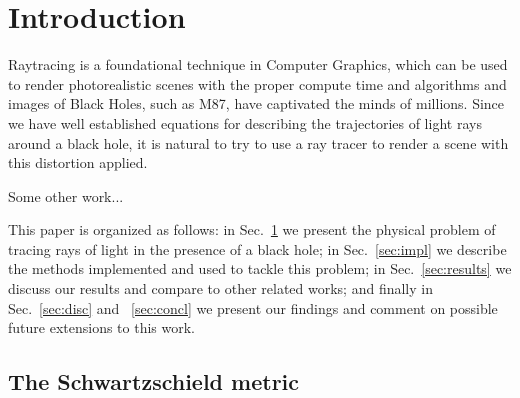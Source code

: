 


\section{Introduction}
\label{sec:intro}



Raytracing is a foundational technique in Computer Graphics, which can be used to render photorealistic scenes with the proper compute time and algorithms and images of Black Holes, such as M87, have captivated the minds of millions. Since we have well established equations for describing the trajectories of light rays around a black hole, it is natural to try to use a ray tracer to render a scene with this distortion applied.



Some other work... \cite{sharma2023mahakalapythonbasedmodularraytracing,James_2015,imbens2023graphicalprocessinggeodesicpropagation}

This paper is organized as follows:
in Sec.~\ref{sec:intro} we present the physical problem of tracing rays of light in the presence of a black hole;
in Sec.~\ref{sec:impl} we describe the methods implemented and used to tackle this problem;
in Sec.~\ref{sec:results} we discuss our results and compare to other related works;
and finally in Sec.~\ref{sec:disc} and ~\ref{sec:concl} we present our findings and comment
on possible future extensions to this work.


\subsection{The Schwartzschield metric}

